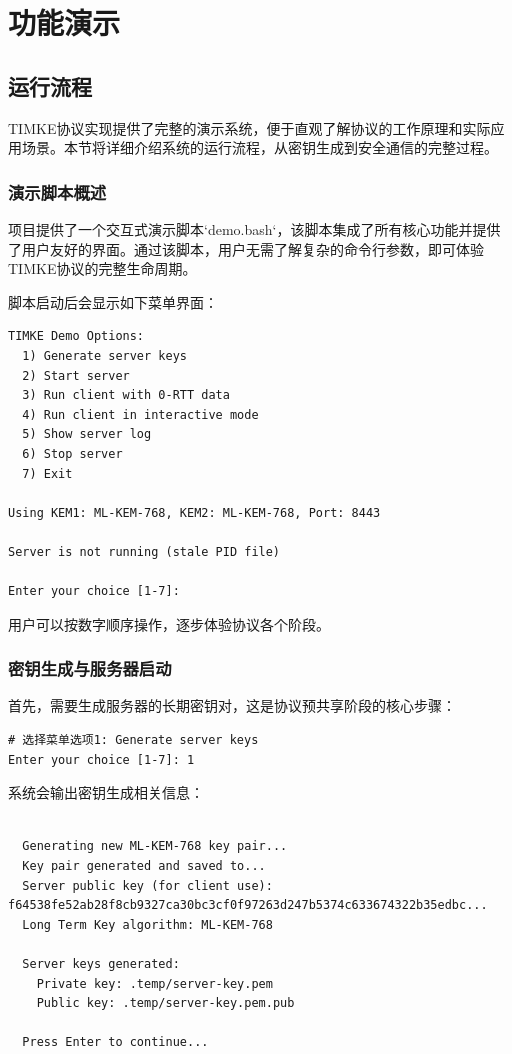 \section{功能演示}

\subsection{运行流程}

TIMKE协议实现提供了完整的演示系统，便于直观了解协议的工作原理和实际应用场景。本节将详细介绍系统的运行流程，从密钥生成到安全通信的完整过程。

\subsubsection{演示脚本概述}

项目提供了一个交互式演示脚本`demo.bash`，该脚本集成了所有核心功能并提供了用户友好的界面。通过该脚本，用户无需了解复杂的命令行参数，即可体验TIMKE协议的完整生命周期。

脚本启动后会显示如下菜单界面：

\begin{verbatim}
TIMKE Demo Options:
  1) Generate server keys
  2) Start server
  3) Run client with 0-RTT data
  4) Run client in interactive mode
  5) Show server log
  6) Stop server
  7) Exit

Using KEM1: ML-KEM-768, KEM2: ML-KEM-768, Port: 8443

Server is not running (stale PID file)

Enter your choice [1-7]: 
\end{verbatim}

用户可以按数字顺序操作，逐步体验协议各个阶段。

\subsubsection{密钥生成与服务器启动}

首先，需要生成服务器的长期密钥对，这是协议预共享阶段的核心步骤：

\begin{verbatim}
# 选择菜单选项1: Generate server keys
Enter your choice [1-7]: 1
\end{verbatim}

系统会输出密钥生成相关信息：

\begin{verbatim}

  Generating new ML-KEM-768 key pair...
  Key pair generated and saved to...
  Server public key (for client use): f64538fe52ab28f8cb9327ca30bc3cf0f97263d247b5374c633674322b35edbc...
  Long Term Key algorithm: ML-KEM-768
  
  Server keys generated:
    Private key: .temp/server-key.pem
    Public key: .temp/server-key.pem.pub
  
  Press Enter to continue...
\end{verbatim}

